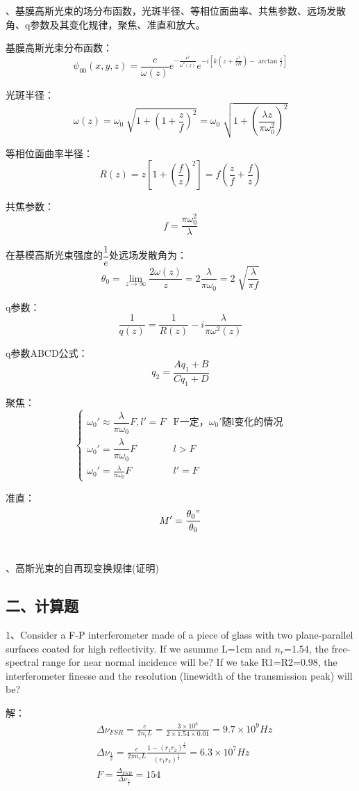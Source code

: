 \documentclass[12pt]{article}
\begin{document}
{、基膜高斯光束的场分布函数，光斑半径、等相位面曲率、共焦参数、远场发散角、q参数及其变化规律，聚焦、准直和放大。
}
{\kaishu \noindent
\par 基膜高斯光束分布函数：
\[
	\psi_{00}\left( x,y,z \right) =\frac{c}{\omega(z)} 
	e^{-\frac{r^2}{\omega^2(z)} }
	e^{-i \left[ k \left( z+\frac{r^2}{2R}  \right) -\arctan \frac{z}{f}  \right] }
\]
\par 光斑半径：
\[
	\omega(z) = \omega_0 \sqrt[]{1+\left( 1+\frac{z}{f}  \right) ^2 } 
		 =\omega_0 \sqrt[]{1+\left( \frac{\lambda z}{\pi \omega_0^2}  \right) ^2}  
\]
\par 等相位面曲率半径：
\[
	R(z)=z \left[ 1+\left( \frac{f}{z}  \right) ^2 \right] = f \left( \frac{z}{f} +\frac{f}{z}  \right) 
\]
\par 共焦参数：
\[
	f=\frac{\pi\omega_0^2}{\lambda} 
\]
\par 在基模高斯光束强度的$\dfrac{1}{e} $处远场发散角为：
\[
	\theta_0 = \lim_{z \to \infty} \frac{2\omega(z)}{z} = 2 \frac{\lambda}{\pi\omega_0} =2 \sqrt[]{\frac{\lambda}{\pi f} } 
\]
\par q参数：
\[
	 \frac{1}{q(z)} = \frac{1}{R(z)} - i \frac{\lambda}{\pi\omega^2(z)} 
\]
\par q参数ABCD公式：
\[
	q_2 = \frac{Aq_1+B}{Cq_1+D} 
\]
\par 聚焦：
\[
	\begin{cases}
		\omega_0'\approx \dfrac{\lambda}{\pi\omega_0} F,l'=F &\text{F一定，$\omega_0'$随l变化的情况}\\
		\omega_0'=\dfrac{\lambda}{\pi\omega_0} F &\text{$l>F$}\\
		\omega_0' = \frac{\lambda}{\pi\omega_0} F &\text{$l'=F$}
	\end{cases}
\]
\par 准直：
\[
	M'= \frac{\theta_0"}{\theta_0} 
\]
\\}

{、高斯光束的自再现变换规律(证明)
}
\newpage



\subsection*{二、计算题}
1、Consider a F-P interferometer made of a piece of glass with two
plane-parallel surfaces coated for high reflectivity. If we asumme L=1cm
and $n_r$=1.54, the free-spectral range for near normal incidence will be? If
we take R1=R2=0.98, the interferometer finesse and the resolution
(linewidth of the transmission peak) will be?
\par 解：
	\begin{align*}
		&\Delta\nu_{FSR}=\frac{c}{2n_r L} = \frac{3\times10^8}{2\times1.54\times0.01} = 9.7\times10^9 \si{Hz}
	  \\& \Delta\nu_{\frac{1}{2} }=\frac{c}{2\pi n_r L} \frac{1-(r_1r_2)^{\frac{1}{2} }}{(r_1r_2)^{\frac{1}{4} }} =6.3\times 10^7 \si{Hz}
	  \\& F=\frac{\Delta_{FSR}}{\Delta\nu_{\frac{1}{2} }} =154
	\end{align*}
\end{document}
